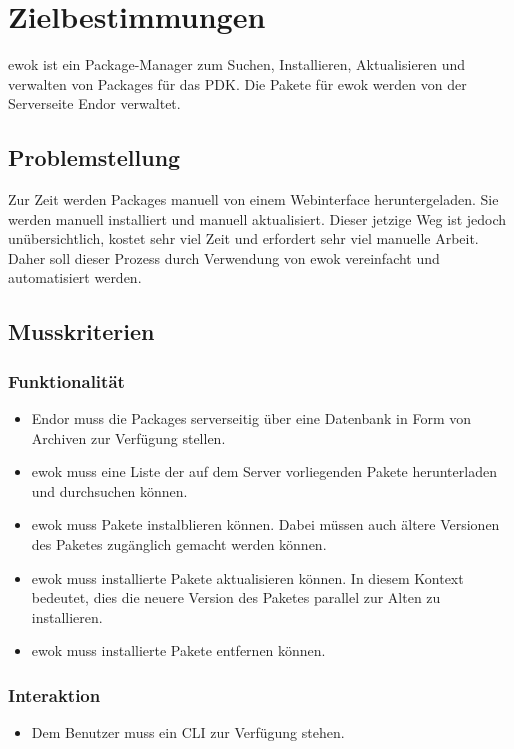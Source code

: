 \chapter{Zielbestimmungen}

ewok ist ein Package-Manager zum Suchen, Installieren, Aktualisieren und verwalten von Packages für das PDK. Die Pakete für ewok werden von der Serverseite Endor verwaltet.

\section{Problemstellung}
Zur Zeit werden Packages manuell von einem Webinterface heruntergeladen. Sie werden manuell installiert und manuell aktualisiert. Dieser jetzige Weg ist jedoch unübersichtlich, kostet sehr viel Zeit und erfordert sehr viel manuelle Arbeit. Daher soll dieser Prozess durch Verwendung von ewok vereinfacht und automatisiert werden.

\section{Musskriterien}
\subsection{Funktionalität}
\begin{itemize}
		\item Endor muss die Packages serverseitig über eine Datenbank in Form von Archiven zur Verfügung stellen.
		\item ewok muss eine Liste der auf dem Server vorliegenden Pakete herunterladen und durchsuchen können.
		\item ewok muss Pakete instalblieren können. Dabei müssen auch ältere Versionen des Paketes zugänglich gemacht werden können.
		\item ewok muss installierte Pakete aktualisieren können. In diesem Kontext bedeutet, dies die neuere Version des Paketes parallel zur Alten zu installieren.
		\item ewok muss installierte Pakete entfernen können.
\end{itemize}

\subsection{Interaktion}


\begin{itemize}
	\item Dem Benutzer muss ein CLI zur Verfügung stehen.
\end{itemize}


